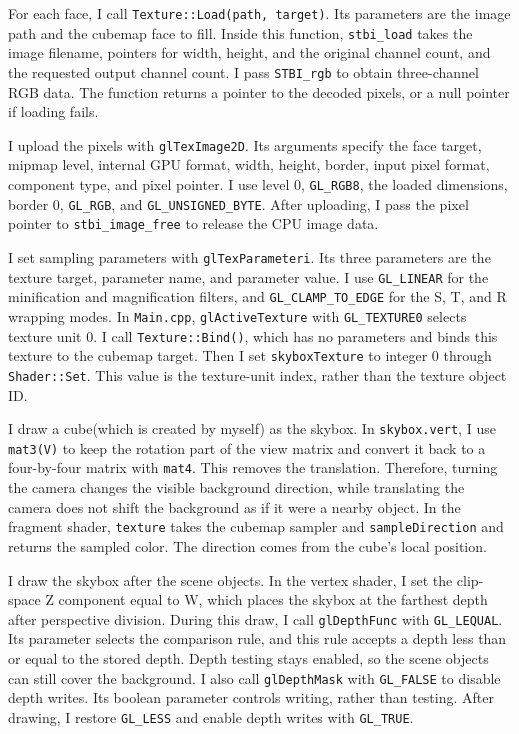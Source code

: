 \documentclass[acmtog]{acmart}
\begin{document}
For each face, I call \texttt{Texture::Load(path, target)}. Its parameters are the image path and the cubemap face to fill. Inside this function, \texttt{stbi\_load} takes the image filename, pointers for width, height, and the original channel count, and the requested output channel count. I pass \texttt{STBI\_rgb} to obtain three-channel RGB data. The function returns a pointer to the decoded pixels, or a null pointer if loading fails.

I upload the pixels with \texttt{glTexImage2D}. Its arguments specify the face target, mipmap level, internal GPU format, width, height, border, input pixel format, component type, and pixel pointer. I use level 0, \texttt{GL\_RGB8}, the loaded dimensions, border 0, \texttt{GL\_RGB}, and \texttt{GL\_UNSIGNED\_BYTE}. After uploading, I pass the pixel pointer to \texttt{stbi\_image\_free} to release the CPU image data.

I set sampling parameters with \texttt{glTexParameteri}. Its three parameters are the texture target, parameter name, and parameter value. I use \texttt{GL\_LINEAR} for the minification and magnification filters, and \texttt{GL\_CLAMP\_TO\_EDGE} for the S, T, and R wrapping modes. In \texttt{Main.cpp}, \texttt{glActiveTexture} with \texttt{GL\_TEXTURE0} selects texture unit 0. I call \texttt{Texture::Bind()}, which has no parameters and binds this texture to the cubemap target. Then I set \texttt{skyboxTexture} to integer 0 through \texttt{Shader::Set}. This value is the texture-unit index, rather than the texture object ID.

I draw a cube(which is created by myself) as the skybox. In \texttt{skybox.vert}, I use \texttt{mat3(V)} to keep the rotation part of the view matrix and convert it back to a four-by-four matrix with \texttt{mat4}. This removes the translation. Therefore, turning the camera changes the visible background direction, while translating the camera does not shift the background as if it were a nearby object. In the fragment shader, \texttt{texture} takes the cubemap sampler and \texttt{sampleDirection} and returns the sampled color. The direction comes from the cube's local position.

I draw the skybox after the scene objects. In the vertex shader, I set the clip-space Z component equal to W, which places the skybox at the farthest depth after perspective division. During this draw, I call \texttt{glDepthFunc} with \texttt{GL\_LEQUAL}. Its parameter selects the comparison rule, and this rule accepts a depth less than or equal to the stored depth. Depth testing stays enabled, so the scene objects can still cover the background. I also call \texttt{glDepthMask} with \texttt{GL\_FALSE} to disable depth writes. Its boolean parameter controls writing, rather than testing. After drawing, I restore \texttt{GL\_LESS} and enable depth writes with \texttt{GL\_TRUE}.
\end{document}

